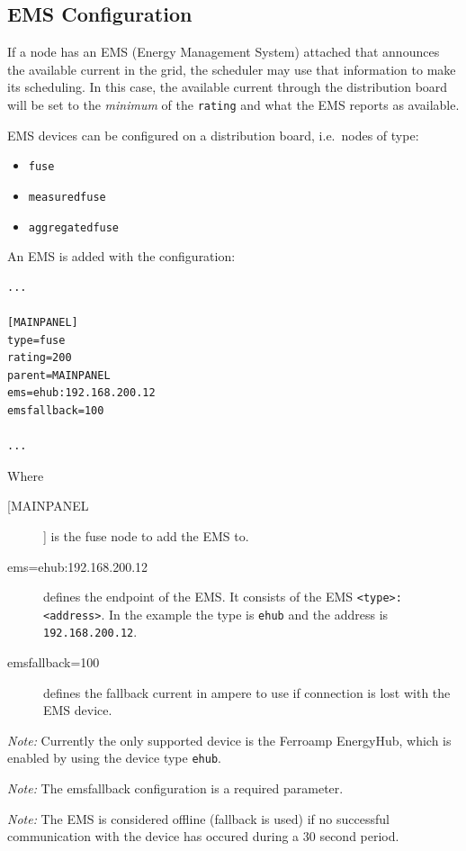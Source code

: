 \documentclass[10pt,a4paper,oneside,headings=big,headsepline]{scrreprt}
\begin{document}
\subsection{EMS Configuration}

If a node has an EMS (Energy Management System) attached that announces the
available current  in the grid, the scheduler may use that information
to make its scheduling. In this case, the available current through the
distribution board will be set to the \emph{minimum} of the \verb|rating| and
what the EMS reports as available.

EMS devices can be configured on a distribution board, i.e.\ nodes of type:

\begin{itemize}
\item \verb|fuse|
\item \verb|measuredfuse|
\item \verb|aggregatedfuse|
\end{itemize}

An EMS is added with the configuration:
\begin{verbatim}
...

[MAINPANEL]
type=fuse
rating=200
parent=MAINPANEL
ems=ehub:192.168.200.12
emsfallback=100

...
\end{verbatim}

Where

\begin{description}
\item [[MAINPANEL]] is the fuse node to add the EMS to.

\item [ems=ehub:192.168.200.12] defines the endpoint of the EMS.
It consists of the EMS \verb|<type>:<address>|. In the example the type is
\verb|ehub| and the address is \verb|192.168.200.12|.

\item [emsfallback=100] defines the fallback current in ampere
to use if connection is lost with the EMS device.
\end{description}

\emph{Note:} Currently the only supported device is the
Ferroamp EnergyHub, which is enabled by using the device type
\verb|ehub|.

\emph{Note:} The emsfallback configuration is a required parameter.

\emph{Note:} The EMS is considered offline (fallback is used)
if no successful communication with the device has occured during a 30
second period.
\end{document}
